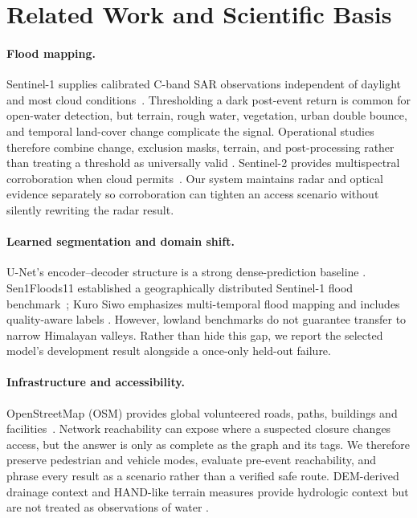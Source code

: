 \documentclass[10pt,twocolumn,letterpaper]{article}
\begin{document}
\section{Related Work and Scientific Basis}
\paragraph{Flood mapping.}
Sentinel-1 supplies calibrated C-band SAR observations independent of daylight
and most cloud conditions~\cite{torres2012sentinel1}. Thresholding a dark
post-event return is common for open-water detection, but terrain, rough water,
vegetation, urban double bounce, and temporal land-cover change complicate the
signal. Operational studies therefore combine change, exclusion masks, terrain,
and post-processing rather than treating a threshold as universally valid
\cite{twele2016sentinel,twele2019sen1flood}. Sentinel-2 provides multispectral
corroboration when cloud permits~\cite{drusch2012sentinel2}. Our system maintains
radar and optical evidence separately so corroboration can tighten an access
scenario without silently rewriting the radar result.

\paragraph{Learned segmentation and domain shift.}
U-Net's encoder--decoder structure is a strong dense-prediction baseline
\cite{ronneberger2015unet}. Sen1Floods11 established a geographically distributed
Sentinel-1 flood benchmark~\cite{bonafilia2020sen1floods11}; Kuro Siwo emphasizes
multi-temporal flood mapping and includes quality-aware labels
\cite{bountos2024kurosiwo}. However, lowland benchmarks do not guarantee transfer
to narrow Himalayan valleys. Rather than hide this gap, we report the selected
model's development result alongside a once-only held-out failure.

\paragraph{Infrastructure and accessibility.}
OpenStreetMap (OSM) provides global volunteered roads, paths, buildings and
facilities~\cite{haklay2010osm}. Network reachability can expose where a suspected
closure changes access, but the answer is only as complete as the graph and its
tags. We therefore preserve pedestrian and vehicle modes, evaluate pre-event
reachability, and phrase every result as a scenario rather than a verified safe
route. DEM-derived drainage context and HAND-like terrain measures provide
hydrologic context but are not treated as observations of water
\cite{nobre2011hand}.
\end{document}
